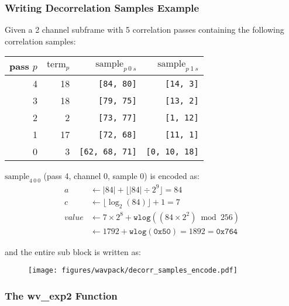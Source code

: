 \subsubsection{Writing Decorrelation Samples Example}
Given a 2 channel subframe with 5 correlation passes containing
the following correlation samples:
\begin{table}[h]
\begin{tabular}{rrrr}
pass $p$ & $\text{term}_p$ & $\text{sample}_{p~0~s}$ & $\text{sample}_{p~1~s}$ \\
\hline
4 & 18 & \texttt{[84, 80]} & \texttt{[14, 3]} \\
3 & 18 & \texttt{[79, 75]} & \texttt{[13, 2]} \\
2 & 2 & \texttt{[73, 77]} & \texttt{[1, 12]} \\
1 & 17 & \texttt{[72, 68]} & \texttt{[11, 1]} \\
0 & 3 & \texttt{[62, 68, 71]} & \texttt{[0, 10, 18]} \\
\end{tabular}
\end{table}
\par
\noindent
$\text{sample}_{4~0~0}$ (pass 4, channel 0, sample 0) is encoded as:
\begin{align*}
a &\leftarrow |84| + \lfloor|84| \div 2 ^ 9\rfloor = 84 \\
c &\leftarrow \lfloor\log_2(84)\rfloor + 1 = 7 \\
value &\leftarrow 7 \times 2 ^ 8 + \texttt{wlog}((84 \times 2 ^ 2) \bmod 256) \\
&\leftarrow 1792 + \texttt{wlog}(\texttt{0x50}) = 1892 = \texttt{0x764}
\end{align*}
\par
\noindent
and the entire sub block is written as:
\begin{figure}[h]
\texttt{[image: figures/wavpack/decorr\_samples\_encode.pdf]}
\end{figure}

\clearpage

\subsubsection{The wv\_exp2 Function}

